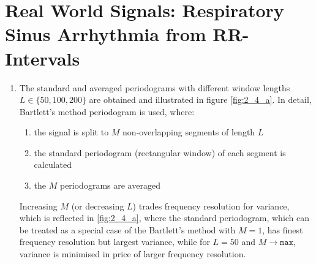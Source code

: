 \section{Real World Signals: Respiratory Sinus Arrhythmia from RR-Intervals}

\begin{enumerate}[label=\alph*), leftmargin=*]
\item
%

The standard and averaged periodograms with different window lengths $L \in \{ 50, 100, 200 \}$ are obtained and illustrated in figure \ref{fig:2_4_a}.
In detail, Bartlett's method periodogram is used, where:

\begin{enumerate}[label=\arabic*)]
    \item the signal is split to $M$ non-overlapping segments of length $L$
    \item the standard periodogram (rectangular window) of each segment is calculated
    \item the $M$ periodograms are averaged
\end{enumerate}

Increasing $M$ (or decreasing $L$) trades frequency resolution for variance, which is reflected in \ref{fig:2_4_a},
where the standard periodogram, which can be treated as a special case of the Bartlett's method with $M = 1$, has finest frequency resolution but largest variance,
while for $L = 50$ and $M \rightarrow \mathtt{max}$, variance is minimised in price of larger frequency resolution.


\end{enumerate}
